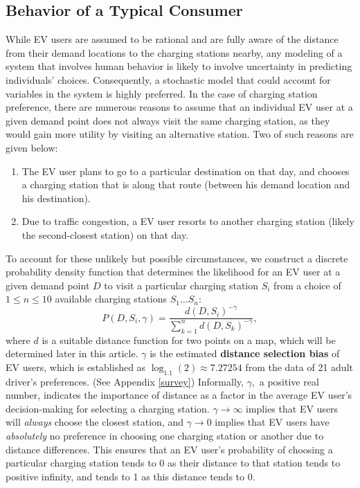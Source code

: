 \documentclass[10pt]{article}
\begin{document}
\subsection{Behavior of a Typical Consumer}\label{behavior}
While EV users are assumed to be rational and are fully aware of the distance from their demand locations to the charging stations nearby, any modeling of a system that involves human behavior is likely to involve uncertainty in predicting individuals' choices. Consequently, a stochastic model that could account for variables in the system is highly preferred. In the case of charging station preference, there are numerous reasons to assume that an individual EV user at a given demand point does not always visit the same charging station, as they would gain more utility by visiting an alternative station. Two of such reasons are given below:
\begin{enumerate}
    \item The EV user plans to go to a particular destination on that day, and chooses a charging station that is along that route (between his demand location and his destination).
    \item Due to traffic congestion, a EV user resorts to another charging station (likely the second-closest station) on that day.
\end{enumerate}
To account for these unlikely but possible circumstances, we construct a discrete probability density function that determines the likelihood for an EV user at a given demand point $D$ to visit a particular charging station $S_i$ from a choice of $1 \leq n \leq 10$ available charging stations $S_1 \dots S_n$: 
\begin{equation}\label{eq:2}
P\left(D, S_i, \gamma\right) = \frac{d\left(D, S_i\right)^{-\gamma}}{\displaystyle\sum_{k=1}^n d\left(D, S_k\right)^{-\gamma}},
\end{equation}
where $d$ is a suitable distance function for two points on a map, which will be determined later in this article. $\gamma$ is the estimated \textbf{distance selection bias} of EV users, which is established as $\log_{1.1}(2) \approx 7.27254$ from the data of 21 adult driver's preferences. (See Appendix \ref{survey}) Informally, $\gamma,$  a positive real number, indicates the importance of distance as a factor in the average EV user's decision-making for selecting a charging station. $\gamma \to \infty$ implies that EV users will \textsl{always} choose the closest station, and $\gamma \to 0$ implies that EV users have \textsl{absolutely} no preference in choosing one charging station or another due to distance differences. This ensures that an EV user's probability of choosing a particular charging station tends to 0 as their distance to that station tends to positive infinity, and tends to 1 as this distance tends to 0.
\end{document}
